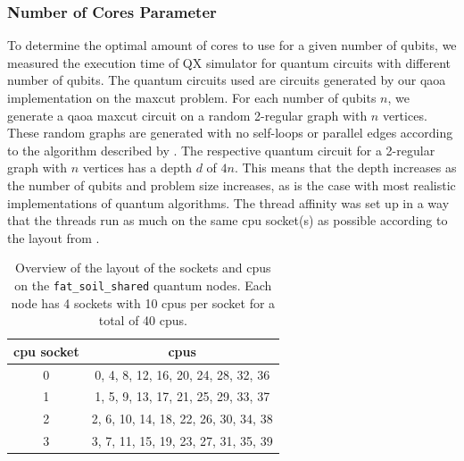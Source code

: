 \subsubsection{Number of Cores Parameter}
To determine the optimal amount of cores to use for a given number of qubits, we measured the execution time of QX simulator for quantum circuits with different number of qubits.
The quantum circuits used are circuits generated by our \gls{qaoa} implementation on the \gls{maxcut} problem.
For each number of qubits $n$, we generate a \gls{qaoa} \gls{maxcut} circuit on a random 2-regular graph with $n$ vertices.
These random graphs are generated with no self-loops or parallel edges according to the algorithm described by \textcite{steger1999generating}.
The respective quantum circuit for a 2-regular graph with $n$ vertices has a depth $d$ of $4n$.
This means that the depth increases as the number of qubits and problem size increases, as is the case with most realistic implementations of quantum algorithms.
The thread affinity was set up in a way that the threads run as much on the same \gls{cpu} socket(s) as possible according to the layout from .
\begin{table}[ht]
    \centering
    {\renewcommand{\arraystretch}{1.05}
        \begin{tabular}{c|c}
            \gls{cpu} socket & \glspl{cpu} \\
            \hline
            0 & 0, 4, 8, 12, 16, 20, 24, 28, 32, 36 \\
            1 & 1, 5, 9, 13, 17, 21, 25, 29, 33, 37 \\
            2 & 2, 6, 10, 14, 18, 22, 26, 30, 34, 38 \\
            3 & 3, 7, 11, 15, 19, 23, 27, 31, 35, 39 \\
        \end{tabular}
    }
    \caption[Overview of the layout of the sockets and \glspl{cpu} on the \texttt{fat_soil_shared} quantum nodes.]{
        Overview of the layout of the sockets and \glspl{cpu} on the \texttt{fat_soil_shared} quantum nodes.
        Each node has 4 sockets with 10 \glspl{cpu} per socket for a total of 40 \glspl{cpu}.
    }
    \label{table:fat-soil-affinities}
\end{table}

